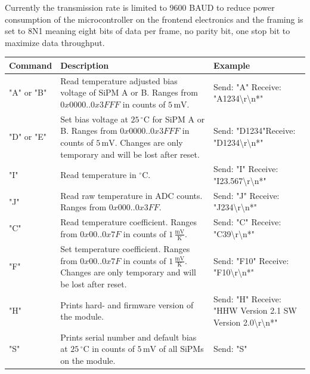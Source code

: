 \documentclass[]{article}
\begin{document}
Currently the transmission rate is limited to 9600 BAUD to reduce power consumption of the microcontroller on the frontend electronics and the framing is set to 8N1 meaning eight 
bits of data per frame, no parity bit, one stop bit to maximize data throughput.

	\begin{table}
		\begin{center}
			\begin{tabular}[]{|l||p{6cm}|p{4cm}|}
			\hline
			Command & Description & Example \\
			\hline
			"A" or "B" & Read temperature adjusted bias voltage of SiPM A or B. Ranges from $0x0000..0x3FFF$ in counts of $5\,\text{mV}$. & Send: "A"
			\newline Receive: "A1234\textbackslash r\textbackslash n*"\\
			\hline
			"D" or "E" & Set bias voltage at $25\,^{\circ} \text{C}$ for SiPM A or B. Ranges from $0x0000..0x3FFF$ in counts of $5\,\text{mV}$. Changes are only 
			temporary and will be lost after reset.& Send: "D1234"\newline Receive: "D1234\textbackslash r\textbackslash n*"\\
			\hline
			"I" & Read temperature in $^{\circ}\text{C}$. & Send: "I" \newline Receive: "I23.567\textbackslash r\textbackslash n*" \\
			\hline
			"J" & Read raw temperature in ADC counts. Ranges from $0x000..0x3FF$. & Send: "J" \newline Receive: "J234\textbackslash r\textbackslash n*" \\
			\hline
			"C" & Read temperature coefficient. Ranges from $0x00..0x7F$ in counts of $1\,\frac{\text{mV}}{\text{K}}$. & Send: "C" 
			\newline Receive: "C39\textbackslash r\textbackslash n*" \\
			\hline
			"F" & Set temperature coefficient. Ranges from $0x00..0x7F$ in counts of $1\,\frac{\text{mV}}{\text{K}}$. Changes are only temporary and 
			will be lost after reset. & Send: "F10" \newline Receive: "F10\textbackslash r\textbackslash n*" \\
			\hline
			"H" & Prints hard- and firmware version of the module. & Send: "H" \newline Receive: "HHW Version 2.1 SW Version 2.0\textbackslash r\textbackslash n*" \\
			\hline
			"S" & Prints serial number and default bias at $25\,^{\circ} \text{C}$ in counts of $5\, \text{mV}$ of all SiPMs on the module. &  Send: "S" 

\end{tabular}
\end{center}
\end{table}
\end{document}
